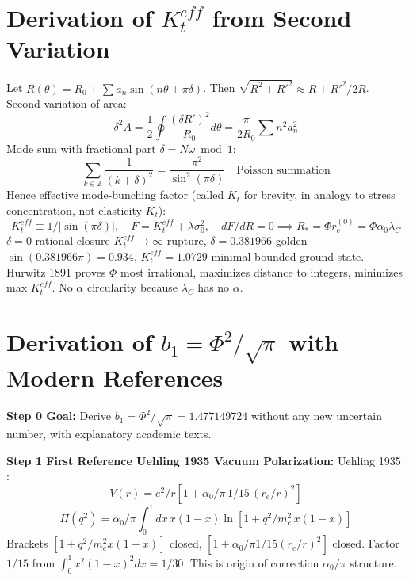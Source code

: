 \documentclass[11pt,a4paper]{article}
\begin{document}
\section{Derivation of $K_t^{eff}$ from Second Variation}
Let $R(\theta)=R_0+\sum a_n\sin(n\theta+\pi\delta)$. Then $\sqrt{R^2+R'^2}\approx R+R'^2/2R$. Second variation of area:
\begin{equation} \delta^2A=\frac12\oint\frac{(\delta R')^2}{R_0}d\theta=\frac{\pi}{2R_0}\sum n^2a_n^2 \end{equation}
Mode sum with fractional part $\delta=N\omega\bmod1$:
\begin{equation} \sum_{k\in\mathbb{Z}}\frac1{(k+\delta)^2}=\frac{\pi^2}{\sin^2(\pi\delta)}\quad\text{Poisson summation} \end{equation}
Hence effective mode-bunching factor (called $K_t$ for brevity, in analogy to stress concentration, not elasticity $K_t$):
\begin{equation} K_t^{eff}\equiv1/|\sin(\pi\delta)|,\quad F=K_t^{eff}+\lambda\sigma_0^2,\quad dF/dR=0\implies R_*=\Phi r_e^{(0)}=\Phi\alpha_0\lambda_C \end{equation}
$\delta=0$ rational closure $K_t^{eff}\to\infty$ rupture, $\delta=0.381966$ golden $\sin(0.381966\pi)=0.934$, $K_t^{eff}=1.0729$ minimal bounded ground state. Hurwitz 1891 proves $\Phi$ most irrational, maximizes distance to integers, minimizes max $K_t^{eff}$. No $\alpha$ circularity because $\lambda_C$ has no $\alpha$.

\section{Derivation of $b_1=\Phi^2/\sqrt{\pi}$ with Modern References}

\textbf{Step 0 Goal:} Derive $b_1=\Phi^2/\sqrt{\pi}=1.477149724$ without any new uncertain number, with explanatory academic texts.

\textbf{Step 1 First Reference Uehling 1935 Vacuum Polarization:}
Uehling 1935 \cite{Uehling1935}:
\begin{equation} V(r)=e^2/r\left[1+\alpha_0/\pi\,1/15\,(r_e/r)^2\right] \end{equation}
\begin{equation} \Pi(q^2)=\alpha_0/\pi\int_0^1dx\,x(1-x)\ln\left[1+q^2/m_e^2\,x(1-x)\right] \end{equation}
Brackets $[1+q^2/m_e^2x(1-x)]$ closed, $[1+\alpha_0/\pi1/15(r_e/r)^2]$ closed. Factor $1/15$ from $\int_0^1x^2(1-x)^2dx=1/30$. This is origin of correction $\alpha_0/\pi$ structure.
\end{document}
